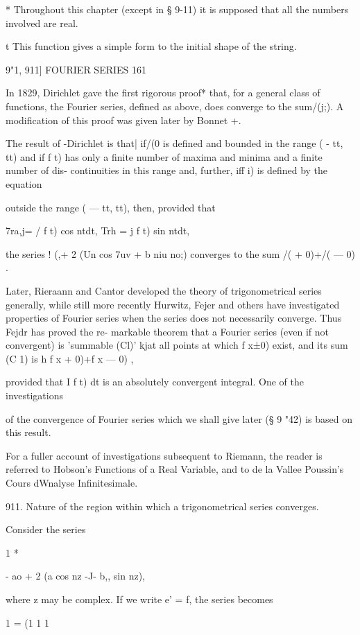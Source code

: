 * Throughout this chapter (except in § 9-11) it is supposed that all
the numbers involved are real.

t This function gives a simple form to the initial shape of the
string.



9"1, 911] FOURIER SERIES 161

In 1829, Dirichlet gave the first rigorous proof* that, for a general
class of functions, the Fourier series, defined as above, does
converge to the sum/(j;). A modification of this proof was given later
by Bonnet +.

The result of -Dirichlet is that| if/(0 is defined and bounded in the
range ( - tt, tt) and if f t) has only a finite number of maxima and
minima and a finite number of dis- continuities in this range and,
further, iff i) is defined by the equation

outside the range ( — tt, tt), then, provided that

7ra,j= / f t) cos ntdt, Trh = j f t) sin ntdt,

the series ! (,+ 2 (Un cos 7uv + b niu no;) converges to the sum /( +
0)+/( — 0) .

Later, Rieraann and Cantor developed the theory of trigonometrical
series generally, while still more recently Hurwitz, Fejer and others
have investigated properties of Fourier series when the series does
not necessarily converge. Thus Fejdr has proved the re- markable
theorem that a Fourier series (even if not convergent) is 'summable
(Cl)' kjat all points at which f x±0) exist, and its sum (C 1) is h f
x + 0)+f x — 0) ,

provided that I f t) dt is an absolutely convergent integral. One of
the investigations

of the convergence of Fourier series which we shall give later (§ 9
"42) is based on this result.

For a fuller account of investigations subsequent to Riemann, the
reader is referred to Hobson's Functions of a Real Variable, and to de
la Vallee Poussin's Cours dWnalyse Infinitesimale.

911. Nature of the region within which a trigonometrical series
converges.

Consider the series

1 *

- ao + 2 (a cos nz -J- b,, sin nz),

where z may be complex. If we write e' = f, the series becomes

1 = (1 1 1

